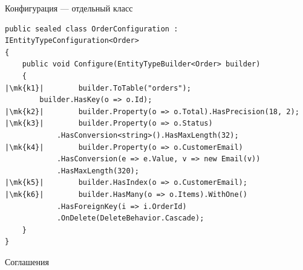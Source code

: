 \documentclass[aspectratio=169,10pt,t]{beamer}
\newcommand{\codexs}{\ttfamily\fontsize{7.0}{8.3}\selectfont}
\newcommand{\mk}[1]{\tikz[remember picture,overlay]\coordinate (#1) at (0,0.55ex);}
\begin{document}
\begin{frame}[fragile]{Конфигурация --- отдельный класс}
  \vspace{0.3em}
\begin{lstlisting}[style=csharp,basicstyle=\codexs,escapechar=|]
public sealed class OrderConfiguration : IEntityTypeConfiguration<Order>
{
    public void Configure(EntityTypeBuilder<Order> builder)
    {
|\mk{k1}|        builder.ToTable("orders");
        builder.HasKey(o => o.Id);
|\mk{k2}|        builder.Property(o => o.Total).HasPrecision(18, 2);
|\mk{k3}|        builder.Property(o => o.Status)
            .HasConversion<string>().HasMaxLength(32);
|\mk{k4}|        builder.Property(o => o.CustomerEmail)
            .HasConversion(e => e.Value, v => new Email(v))
            .HasMaxLength(320);
|\mk{k5}|        builder.HasIndex(o => o.CustomerEmail);
|\mk{k6}|        builder.HasMany(o => o.Items).WithOne()
            .HasForeignKey(i => i.OrderId)
            .OnDelete(DeleteBehavior.Cascade);
    }
}
\end{lstlisting}
\end{frame}

\begin{frame}{Соглашения}
  \slidetop

  \slidegap
\end{frame}
\end{document}
